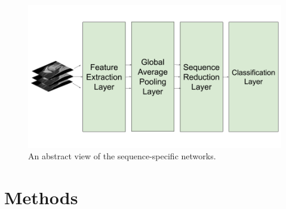 \documentclass[10pt,twocolumn,letterpaper]{article}
\begin{document}
\begin{figure}
\begin{center}
\includegraphics[width=0.6\linewidth]{../images/diagram/network2.png}
\end{center}
   \caption{An abstract view of the sequence-specific networks.}
\label{fig:network}
\end{figure}

\section{Methods} %

\end{document}
